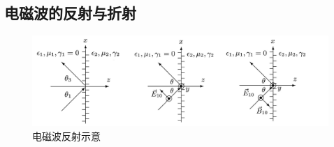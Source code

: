 \documentclass[12pt,a4paper]{article}%
\numberwithin{equation}{section}%
\begin{document}
\subsection{电磁波的反射与折射} %
\label{sub:reflect_and_refraction}
    \begin{figure}[hbt]
        \centering
        \includegraphics[width=1.2\linewidth]{note_Wave_Reflect.jpg}
      \caption{电磁波反射示意\label{fig:wave_reflect}}
    \end{figure}
\end{document}
